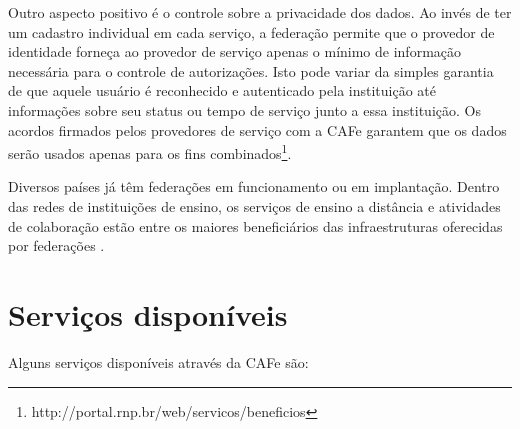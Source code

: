 Outro aspecto positivo é o controle sobre a privacidade dos dados. Ao invés de ter um cadastro individual em cada serviço, a federação permite que o provedor de identidade forneça ao provedor de serviço apenas o mínimo de informação necessária para o controle de autorizações. Isto pode variar da simples garantia de que aquele usuário é reconhecido e autenticado pela instituição até informações sobre seu status ou tempo de serviço junto a essa instituição. Os acordos firmados pelos provedores de serviço com a CAFe garantem que os dados serão usados apenas para os fins combinados\footnote{http://portal.rnp.br/web/servicos/beneficios}.

Diversos países já têm federações em funcionamento ou em implantação. Dentro das redes de instituições de ensino, os serviços de ensino a distância e atividades de colaboração estão entre os maiores beneficiários das infraestruturas oferecidas por federações \cite{rnp:13}.

\section{Serviços disponíveis}
\label{s_c3_servicos}

Alguns serviços disponíveis através da CAFe são:

